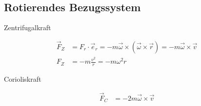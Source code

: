 \subsection{Rotierendes Bezugssystem}

\begin{boxleft}Zentrifugalkraft
\end{boxleft}\begin{boxrightshaded}
\begin{align}
\vec{F}_Z&=F_r\cdot \vec{e}_r=-m\vec{\omega}\times\left(\vec{\omega}\times\vec{r}\right)=-m\vec{\omega}\times\vec{v}\\
  F_Z&=-m\frac{v^2}{r}=-m\omega^2 r
\end{align}
\end{boxrightshaded}

\begin{boxleft}Corioliskraft
\end{boxleft}\begin{boxrightshaded}
\begin{align}
\vec{F}_C&=-2m\vec{\omega}\times\vec{v}
\end{align}
\end{boxrightshaded}


